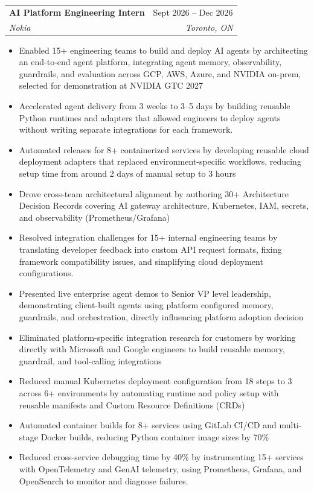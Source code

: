 \documentclass[letterpaper,11pt]{article}
\makeatletter
\newcommand{\resumeItem}[1]{
  \item\small{
    {#1 \vspace{-2pt}}
  }
}
\newcommand{\resumeSubheading}[4]{
  \vspace{-2pt}\item
    \begin{tabular*}{0.97\textwidth}[t]{l@{\extracolsep{\fill}}r}
      \textbf{#1} & #2 \\
      \textit{\small#3} & \textit{\small #4} \\
    \end{tabular*}\vspace{-7pt}
}
\newcommand{\resumeItemListStart}{\begin{itemize}}
\newcommand{\resumeItemListEnd}{\end{itemize}\vspace{-5pt}}
\makeatother
\begin{document}
    \resumeSubheading
      {AI Platform Engineering Intern}{Sept 2026 -- Dec 2026}
      {Nokia}{Toronto, ON}
      \resumeItemListStart
        \resumeItem{Enabled 15+ engineering teams to build and deploy AI agents by architecting an end-to-end agent platform, integrating agent memory, observability, guardrails, and evaluation across GCP, AWS, Azure, and NVIDIA on-prem, selected for demonstration at NVIDIA GTC 2027}
        \resumeItem{Accelerated agent delivery from 3 weeks to 3–5 days by building reusable Python runtimes and adapters that allowed engineers to deploy agents without writing separate integrations for each framework.} 
        \resumeItem{Automated releases for 8+ containerized services by developing reusable cloud deployment adapters that replaced environment-specific workflows, reducing setup time from around 2 days of manual setup to 3 hours}
        \resumeItem{Drove cross-team architectural alignment by authoring 30+ Architecture Decision Records covering AI gateway architecture, Kubernetes, IAM, secrets, and observability (Prometheus/Grafana)} 
        \resumeItem{Resolved integration challenges for 15+ internal engineering teams by translating developer feedback into custom API request formats, fixing framework compatibility issues, and simplifying cloud deployment configurations.} 
        \resumeItem{Presented live enterprise agent demos to Senior VP level leadership, demonstrating client-built agents using platform configured memory, guardrails, and orchestration, directly influencing platform adoption decision}
        \resumeItem{Eliminated platform-specific integration research for customers by working directly with Microsoft and Google engineers to build reusable memory, guardrail, and tool-calling integrations} 
        \resumeItem{Reduced manual Kubernetes deployment configuration from 18 steps to 3 across 6+ environments by automating runtime and policy setup with reusable manifests and Custom Resource Definitions (CRDs)}
        \resumeItem{Automated container builds for 8+ services using GitLab CI/CD and multi-stage Docker builds, reducing Python container image sizes by 70\%}
        \resumeItem{Reduced cross-service debugging time by 40\% by instrumenting 15+ services with OpenTelemetry and GenAI telemetry, using Prometheus, Grafana, and OpenSearch to monitor and diagnose failures.}
      \resumeItemListEnd
\end{document}

